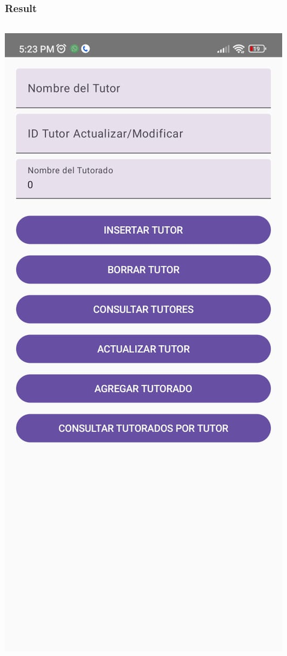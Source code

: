 \documentclass[pdf,
serif,
compress,
xcolor=table,
dvipsnames,
spanish,
aspectratio=169]{beamer}
\begin{document}
\begin{frame}
    \frametitle{Result}

    \begin{columns}
        \begin{center}
            \includegraphics[width=0.7\linewidth]{graphics/Inicio.jpeg} %
        \end{center}


\end{columns}
\end{frame}
\end{document}
